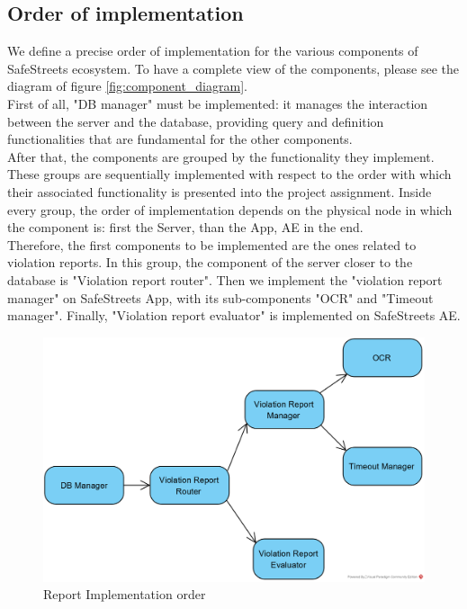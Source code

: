 \documentclass{article}
\begin{document}
		\subsection{Order of implementation}
		We define a precise order of implementation for the various components of SafeStreets ecosystem. To have a complete view of the components, please see the diagram of figure \ref{fig:component_diagram}.\\
		First of all, "DB manager" must be implemented: it manages the interaction between the server and the database, providing query and definition functionalities that are fundamental for the other components.\\
		After that, the components are grouped by the functionality they implement. These groups are sequentially implemented with respect to the order with which their associated functionality is presented into the project assignment. Inside every group, the order of implementation depends on the physical node in which the component is: first the Server, than the App, AE in the end.\\
		Therefore, the first components to be implemented are the ones related to violation reports. In this group, the component of the server closer to the database is "Violation report router". Then we implement the "violation report manager" on SafeStreets App, with its sub-components "OCR" and "Timeout manager". Finally, "Violation report evaluator" is implemented on SafeStreets AE.\\
		\begin{figure}[H]
			\centering
			\includegraphics [width=\textwidth] {diagrams/report_impltest.png}
			\caption[Report Implementation order]{Report Implementation order}
			\label{fig:report_order}
		\end{figure}
\end{document}
